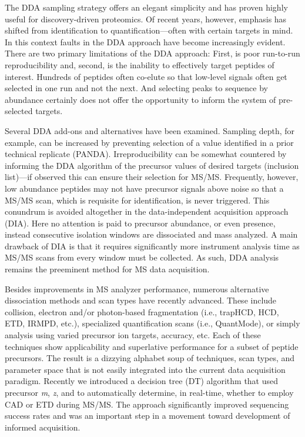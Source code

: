 The DDA sampling strategy offers an elegant simplicity and has proven highly useful for discovery-driven proteomics. Of recent years, however, emphasis has shifted from identification to quantification---often with certain targets in mind. In this context faults in the DDA approach have become increasingly evident. There are two primary limitations of the DDA approach: First, is poor run-to-run reproducibility and, second, is the inability to effectively target peptides of interest.\cite{randomsampling} Hundreds of peptides often co-elute so that low-level signals often get selected in one run and not the next. And selecting \mz{} peaks to sequence by abundance certainly does not offer the opportunity to inform the system of pre-selected targets.

Several DDA add-ons and alternatives have been examined. Sampling depth, for example, can be increased by preventing selection of a \mz{} value identified in a prior technical replicate (PANDA).\cite{panda} Irreproducibility can be somewhat countered by informing the DDA algorithm of the precursor \mz{} values of desired targets (inclusion list)---if observed this can ensure their selection for MS/MS. Frequently, however, low abundance peptides may not have precursor signals above noise so that a MS/MS scan, which is requisite for identification, is never triggered. This conundrum is avoided altogether in the data-independent acquisition approach (DIA).\cite{dia} Here no attention is paid to precursor abundance, or even presence, instead consecutive \mz{} isolation windows are dissociated and mass analyzed. A main drawback of DIA is that it requires significantly more instrument analysis time as MS/MS scans from every \mz{} window must be collected.\cite{ocean} As such, DDA analysis remains the preeminent method for MS data acquisition.

Besides improvements in MS analyzer performance, numerous alternative dissociation methods and scan types have recently advanced. These include collision, electron and/or photon-based fragmentation (i.e., trapHCD, HCD, ETD, IRMPD, etc.), specialized quantification scans (i.e., QuantMode), or simply analysis using varied precursor ion targets, \mz{} accuracy, etc.\cite{traphcd,hcd,etd,irmpd,quantmode,twostage} Each of these techniques show applicability and superlative performance for a subset of peptide precursors. The result is a dizzying alphabet soup of techniques, scan types, and parameter space that is not easily integrated into the current data acquisition paradigm. Recently we introduced a decision tree (DT) algorithm that used precursor \textit{m}, \textit{z}, and \mz{} to automatically determine, in real-time, whether to employ CAD or ETD during MS/MS.\cite{dtree} The approach significantly improved sequencing success rates and was an important step in a movement toward development of informed acquisition.

